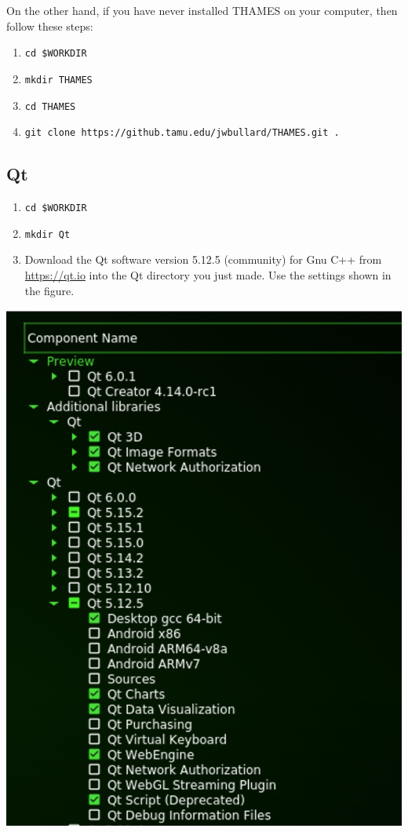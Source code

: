 \documentclass{article}
\begin{document}
On the other hand, if you have never installed THAMES on your computer, then
follow these steps:
\begin{enumerate}
        \item \verb!cd $WORKDIR!
        \item \verb!mkdir THAMES!
        \item \verb!cd THAMES!
        \item \verb!git clone https://github.tamu.edu/jwbullard/THAMES.git .!
\end{enumerate}

\subsection{Qt}
\begin{enumerate}
    \item \verb!cd $WORKDIR!
    \item \verb!mkdir Qt!
    \item Download the Qt software version 5.12.5 (community) for Gnu C++ from 
        \href{https://qt.io}{https://qt.io} into the Qt directory you just made.
        Use the settings shown in the figure.
\end{enumerate}

\begin{center}
    \includegraphics[scale=0.4]{Figures/Qt-screen.png}
\end{center}
\end{document}
